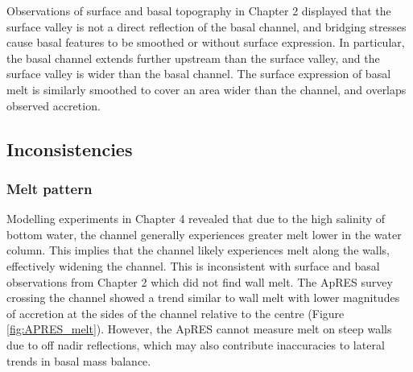 Observations of surface and basal topography in Chapter 2 displayed that the surface valley is not a direct reflection of the basal channel, and bridging stresses cause basal features to be smoothed or without surface expression. In particular, the basal channel extends further upstream than the surface valley, and the surface valley is wider than the basal channel. The surface expression of basal melt is similarly smoothed to cover an area wider than the channel, and overlaps observed accretion. 

\subsection{Inconsistencies}

\subsubsection{Melt pattern}

Modelling experiments in Chapter 4 revealed that due to the high salinity of bottom water, the channel generally experiences greater melt lower in the water column. This implies that the channel likely experiences melt along the walls, effectively widening the channel. This is inconsistent with surface and basal observations from Chapter 2 which did not find wall melt. 
The ApRES survey crossing the channel showed a trend similar to wall melt with lower magnitudes of accretion at the sides of the channel relative to the centre (Figure \ref{fig:APRES_melt}). However, the ApRES cannot measure melt on steep walls due to off nadir reflections, which may also contribute inaccuracies to lateral trends in basal mass balance.

